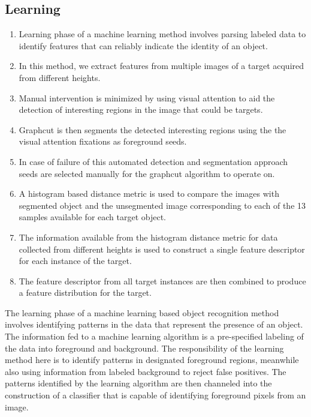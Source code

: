 \documentclass {udthesis}
\begin{document}
\subsection{Learning}

\begin{enumerate}
	\item Learning phase of a machine learning method involves parsing labeled data to identify features that can reliably indicate the identity of an object.
	
	\item In this method, we extract features from multiple images of a target acquired from different heights.
	
	\item Manual intervention is minimized by using visual attention to aid the detection of interesting regions in the image that could be targets.
	
	\item Graphcut is then segments the detected interesting regions using the the visual attention fixations as foreground seeds.
	
	\item In case of failure of this automated detection and segmentation approach seeds are selected manually for the graphcut algorithm to operate on.
	
	\item A histogram based distance metric is used to compare the images with segmented object and the unsegmented image corresponding to each of the 13 samples available for each target object.
	
	\item The information available from the histogram distance metric for data collected from different heights is used to construct a single feature descriptor for each instance of the target.
	
	\item The feature descriptor from all target instances are then combined to produce a feature distribution for the target.
\end{enumerate}


The learning phase of a machine learning based object recognition method involves identifying patterns in the data that represent the presence of an object. The information fed to a machine learning algorithm is a pre-specified labeling of the data into foreground and background. The responsibility of the learning method here is to identify patterns in designated foreground regions, meanwhile also using information from labeled background to reject false positives. The patterns identified by the learning algorithm are then channeled into the construction of a classifier that is capable of identifying foreground pixels from an image.
\end{document}
